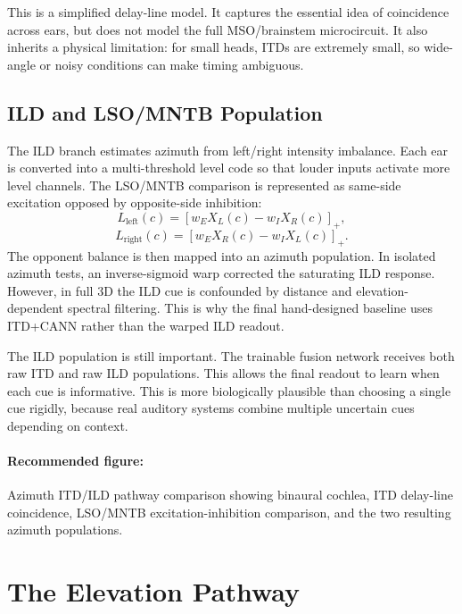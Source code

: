 This is a simplified delay-line model. It captures the essential idea of coincidence across ears, but does not model the full MSO/brainstem microcircuit. It also inherits a physical limitation: for small heads, ITDs are extremely small, so wide-angle or noisy conditions can make timing ambiguous.

\subsection{ILD and LSO/MNTB Population}

The ILD branch estimates azimuth from left/right intensity imbalance. Each ear is converted into a multi-threshold level code so that louder inputs activate more level channels. The LSO/MNTB comparison is represented as same-side excitation opposed by opposite-side inhibition:
\begin{equation}
    L_{\text{left}}(c) =
    \left[
        w_E X_L(c) - w_I X_R(c)
    \right]_+,
\end{equation}
\begin{equation}
    L_{\text{right}}(c) =
    \left[
        w_E X_R(c) - w_I X_L(c)
    \right]_+.
\end{equation}
The opponent balance is then mapped into an azimuth population. In isolated azimuth tests, an inverse-sigmoid warp corrected the saturating ILD response. However, in full 3D the ILD cue is confounded by distance and elevation-dependent spectral filtering. This is why the final hand-designed baseline uses ITD+CANN rather than the warped ILD readout.

The ILD population is still important. The trainable fusion network receives both raw ITD and raw ILD populations. This allows the final readout to learn when each cue is informative. This is more biologically plausible than choosing a single cue rigidly, because real auditory systems combine multiple uncertain cues depending on context.

\paragraph{Recommended figure:} Azimuth ITD/ILD pathway comparison showing binaural cochlea, ITD delay-line coincidence, LSO/MNTB excitation-inhibition comparison, and the two resulting azimuth populations.

\section{The Elevation Pathway}

